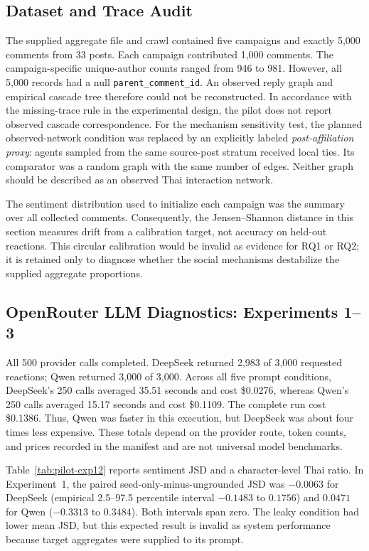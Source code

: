 \documentclass[conference]{IEEEtran}
\begin{document}
\subsection{Dataset and Trace Audit}

The supplied aggregate file and crawl contained five campaigns and exactly
5,000 comments from 33 posts. Each campaign contributed 1,000 comments. The
campaign-specific unique-author counts ranged from 946 to 981. However, all
5,000 records had a null \texttt{parent\_comment\_id}. An observed reply graph
and empirical cascade tree therefore could not be reconstructed. In accordance
with the missing-trace rule in the experimental design, the pilot does not
report observed cascade correspondence. For the mechanism sensitivity test,
the planned observed-network condition was replaced by an explicitly labeled
\emph{post-affiliation proxy}: agents sampled from the same source-post stratum
received local ties. Its comparator was a random graph with the same number of
edges. Neither graph should be described as an observed Thai interaction
network.

The sentiment distribution used to initialize each campaign was the summary
over all collected comments. Consequently, the Jensen--Shannon distance in this
section measures drift from a calibration target, not accuracy on held-out
reactions. This circular calibration would be invalid as evidence for RQ1 or
RQ2; it is retained only to diagnose whether the social mechanisms destabilize
the supplied aggregate proportions.

\subsection{OpenRouter LLM Diagnostics: Experiments 1--3}

All 500 provider calls completed. DeepSeek returned 2,983 of 3,000 requested
reactions; Qwen returned 3,000 of 3,000. Across all five prompt conditions,
DeepSeek's 250 calls averaged 35.51 seconds and cost \$0.0276, whereas Qwen's
250 calls averaged 15.17 seconds and cost \$0.1109. The complete run cost
\$0.1386. Thus, Qwen was faster in this execution, but DeepSeek was about four
times less expensive. These totals depend on the provider route, token counts,
and prices recorded in the manifest and are not universal model benchmarks.

Table~\ref{tab:pilot-exp12} reports sentiment JSD and a character-level Thai
ratio. In Experiment~1, the paired seed-only-minus-ungrounded JSD was $-0.0063$
for DeepSeek (empirical 2.5--97.5 percentile interval $-0.1483$ to $0.1756$)
and $0.0471$ for Qwen ($-0.3313$ to $0.3484$). Both intervals span zero. The
leaky condition had lower mean JSD, but this expected result is invalid as
system performance because target aggregates were supplied to its prompt.
\end{document}
